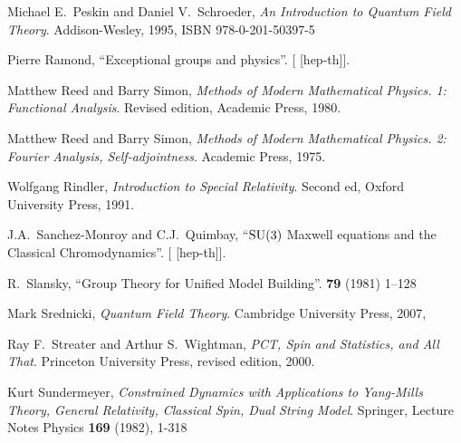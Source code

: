 \begin{thebibliography}{99}
Michael E.~Peskin and Daniel V.~Schroeder,
\textit{An Introduction to Quantum Field Theory}.
Addison-Wesley, 1995,
ISBN 978-0-201-50397-5

Pierre Ramond,
``Exceptional groups and physics''.
[ [hep-th]].

Matthew Reed and Barry Simon,
\textit{Methods of Modern Mathematical Physics. 1: Functional Analysis}.
Revised edition, Academic Press, 1980.

Matthew Reed and Barry Simon,
\textit{Methods of Modern Mathematical Physics. 2: Fourier Analysis, Self-adjointness}.
Academic Press, 1975.

Wolfgang Rindler,
\textit{Introduction to Special Relativity}.
Second ed, Oxford University Press, 1991.

  
J.A.~Sanchez-Monroy and C.J.~Quimbay,
``$\operatorname{SU}(3)$ Maxwell equations and the Classical Chromodynamics''.
[ [hep-th]].

R.~Slansky,
``Group Theory for Unified Model Building''.
 \textbf{79} (1981) 1--128
{\tt{}}

Mark Srednicki,
\textit{Quantum Field Theory}.
Cambridge University Press, 2007,
{\tt{}}

Ray F.~Streater and Arthur S.~Wightman,
\textit{PCT, Spin and Statistics, and All That}.
Princeton University Press, revised edition, 2000.

Kurt Sundermeyer,
\textit{Constrained Dynamics with Applications to Yang-Mills Theory, General Relativity, Classical Spin, Dual String Model}.
Springer, Lecture Notes Physics \textbf{169} (1982), 1-318




\end{thebibliography}
